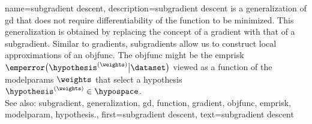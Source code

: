 {name={subgradient descent}, 
	description={\Gls{subgradient} 
		descent is a \gls{generalization} of \gls{gd} that does not require differentiability of the 
		\gls{function} to be minimized. This \gls{generalization} is obtained by replacing the concept 
		of a \gls{gradient} with that of a \gls{subgradient}. Similar to \glspl{gradient}, \glspl{subgradient} 
		allow us to construct local approximations of an \gls{objfunc}. The \gls{objfunc} 
		might be the \gls{emprisk} $\emperror\big( \hypothesis^{(\weights)} \big| \dataset \big)$ viewed 
		as a \gls{function} of the \glspl{modelparam} $\weights$ that select a \gls{hypothesis} $\hypothesis^{(\weights)} \in \hypospace$.
				\\
		See also: \gls{subgradient}, \gls{generalization}, \gls{gd}, \gls{function}, \gls{gradient}, \gls{objfunc}, \gls{emprisk}, \gls{modelparam}, \gls{hypothesis}.},
	first={subgradient descent},
	text={subgradient descent} 
}
	
